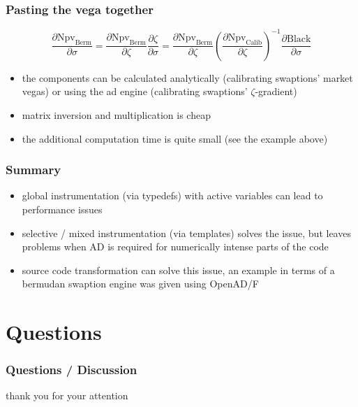 \documentclass{beamer}
\begin{document}
\begin{frame}[fragile]
\frametitle{Pasting the vega together}
\begin{equation*}
\frac{\partial \text{Npv}_\text{Berm}}{\partial \sigma} = \frac{\partial \text{Npv}_\text{Berm}}{\partial \zeta} \frac{\partial \zeta}{\partial \sigma} = \frac{\partial \text{Npv}_\text{Berm}}{\partial \zeta} \left( \frac{\partial \text{Npv}_\text{Calib}}{\partial \zeta} \right) ^ {-1} \frac{\partial \text{Black}}{\partial \sigma}
\end{equation*}
\begin{itemize}
\item the components can be calculated analytically (calibrating swaptions' market vegas) or using the ad engine (calibrating swaptions' $\zeta$-gradient)
\item matrix inversion and multiplication is cheap
\item the additional computation time is quite small (see the example above)
\end{itemize}
\end{frame}

\begin{frame}[fragile]
\frametitle{Summary}
\begin{itemize}
\item global instrumentation (via typedefs) with active variables can lead to performance issues
\item selective / mixed instrumentation (via templates) solves the issue, but leaves problems when AD is required for numerically intense parts of the code
\item source code transformation can solve this issue, an example in terms of a bermudan swaption engine was given using OpenAD/F
\end{itemize}
\end{frame}

\section{Questions}

\begin{frame}[fragile]
\frametitle{Questions / Discussion}
\centerline{thank you for your attention}
\end{frame}
\end{document}
